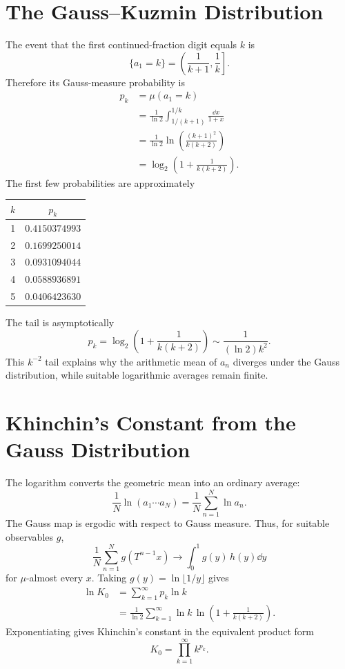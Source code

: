 \documentclass[a4paper]{article}
\begin{document}
\section{The Gauss--Kuzmin Distribution}
The event that the first continued-fraction digit equals $k$ is
\begin{equation}
 \{a_1=k\}=\left(\frac1{k+1},\frac1k\right].
\end{equation}
Therefore its Gauss-measure probability is
\begin{align}
 p_k
 &=\mu(a_1=k)\\
 &=\frac1{\ln2}\int_{1/(k+1)}^{1/k}\frac{\dd x}{1+x}\\
 &=\frac1{\ln2}\ln\left(\frac{(k+1)^2}{k(k+2)}\right)\\
 &=\boxed{\log_2\left(1+\frac1{k(k+2)}\right)}.
\end{align}
The first few probabilities are approximately
\begin{center}
\begin{tabular}{c c}
\toprule
$k$ & $p_k$\\
\midrule
1 & $0.4150374993$\\
2 & $0.1699250014$\\
3 & $0.0931094044$\\
4 & $0.0588936891$\\
5 & $0.0406423630$\\
\bottomrule
\end{tabular}
\end{center}

The tail is asymptotically
\begin{equation}
 p_k=\log_2\left(1+\frac1{k(k+2)}\right)
 \sim\frac{1}{(\ln2)k^2}.
\end{equation}
This $k^{-2}$ tail explains why the arithmetic mean of $a_n$ diverges under the Gauss distribution, while suitable logarithmic averages remain finite.

\section{Khinchin's Constant from the Gauss Distribution}
The logarithm converts the geometric mean into an ordinary average:
\begin{equation}
 \frac1N\ln(a_1\cdots a_N)=\frac1N\sum_{n=1}^N\ln a_n.
\end{equation}
The Gauss map is ergodic with respect to Gauss measure. Thus, for suitable observables $g$,
\begin{equation}
 \frac1N\sum_{n=1}^N g(T^{n-1}x)
 \longrightarrow
 \int_0^1g(y)\,h(y)\dd y
\end{equation}
for $\mu$-almost every $x$.
Taking $g(y)=\ln\lfloor1/y\rfloor$ gives
\begin{align}
 \ln K_0
 &=\sum_{k=1}^{\infty}p_k\ln k\\
 &=\frac1{\ln2}\sum_{k=1}^{\infty}
 \ln k\,\ln\left(1+\frac1{k(k+2)}\right).
\end{align}
Exponentiating gives Khinchin's constant in the equivalent product form
\begin{equation}
 K_0=\prod_{k=1}^{\infty}k^{p_k}.
\end{equation}
\end{document}
